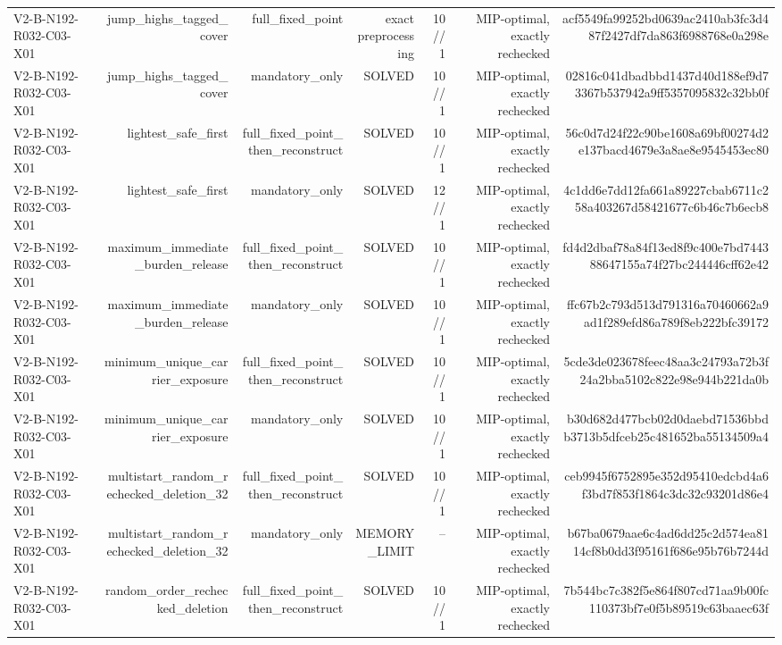 {\begin{longtable}{lrrrrrr}
V2-B-N192-R032-C03-X01 & jump\_highs\_tagged\_cover & full\_fixed\_point & exact preprocessing & 10//1 & MIP-optimal, exactly rechecked & acf5549fa99252bd0639ac2410ab3fc3d487f2427df7da863f6988768e0a298e \\
V2-B-N192-R032-C03-X01 & jump\_highs\_tagged\_cover & mandatory\_only & SOLVED & 10//1 & MIP-optimal, exactly rechecked & 02816c041dbadbbd1437d40d188ef9d73367b537942a9ff5357095832c32bb0f \\
V2-B-N192-R032-C03-X01 & lightest\_safe\_first & full\_fixed\_point\_then\_reconstruct & SOLVED & 10//1 & MIP-optimal, exactly rechecked & 56c0d7d24f22c90be1608a69bf00274d2e137bacd4679e3a8ae8e9545453ec80 \\
V2-B-N192-R032-C03-X01 & lightest\_safe\_first & mandatory\_only & SOLVED & 12//1 & MIP-optimal, exactly rechecked & 4c1dd6e7dd12fa661a89227cbab6711c258a403267d58421677c6b46c7b6ecb8 \\
V2-B-N192-R032-C03-X01 & maximum\_immediate\_burden\_release & full\_fixed\_point\_then\_reconstruct & SOLVED & 10//1 & MIP-optimal, exactly rechecked & fd4d2dbaf78a84f13ed8f9c400e7bd744388647155a74f27bc244446cff62e42 \\
V2-B-N192-R032-C03-X01 & maximum\_immediate\_burden\_release & mandatory\_only & SOLVED & 10//1 & MIP-optimal, exactly rechecked & ffc67b2c793d513d791316a70460662a9ad1f289efd86a789f8eb222bfc39172 \\
V2-B-N192-R032-C03-X01 & minimum\_unique\_carrier\_exposure & full\_fixed\_point\_then\_reconstruct & SOLVED & 10//1 & MIP-optimal, exactly rechecked & 5cde3de023678feec48aa3c24793a72b3f24a2bba5102c822e98e944b221da0b \\
V2-B-N192-R032-C03-X01 & minimum\_unique\_carrier\_exposure & mandatory\_only & SOLVED & 10//1 & MIP-optimal, exactly rechecked & b30d682d477bcb02d0daebd71536bbdb3713b5dfceb25c481652ba55134509a4 \\
V2-B-N192-R032-C03-X01 & multistart\_random\_rechecked\_deletion\_32 & full\_fixed\_point\_then\_reconstruct & SOLVED & 10//1 & MIP-optimal, exactly rechecked & ceb9945f6752895e352d95410edcbd4a6f3bd7f853f1864c3dc32c93201d86e4 \\
V2-B-N192-R032-C03-X01 & multistart\_random\_rechecked\_deletion\_32 & mandatory\_only & MEMORY\_LIMIT & -- & MIP-optimal, exactly rechecked & b67ba0679aae6c4ad6dd25c2d574ea8114cf8b0dd3f95161f686e95b76b7244d \\
V2-B-N192-R032-C03-X01 & random\_order\_rechecked\_deletion & full\_fixed\_point\_then\_reconstruct & SOLVED & 10//1 & MIP-optimal, exactly rechecked & 7b544bc7c382f5e864f807cd71aa9b00fc110373bf7e0f5b89519c63baaec63f \\

\end{longtable}}
